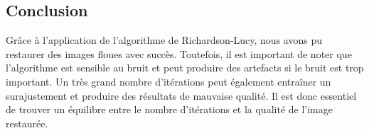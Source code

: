 \subsection{Conclusion}

Grâce à l'application de l'algorithme de Richardson-Lucy, nous avons pu restaurer des images floues avec succès.
Toutefois, il est important de noter que l'algorithme est sensible au bruit et peut produire des artefacts si le bruit est trop important.
Un très grand nombre d'itérations peut également entraîner un surajustement et produire des résultats de mauvaise qualité.
Il est donc essentiel de trouver un équilibre entre le nombre d'itérations et la qualité de l'image restaurée.